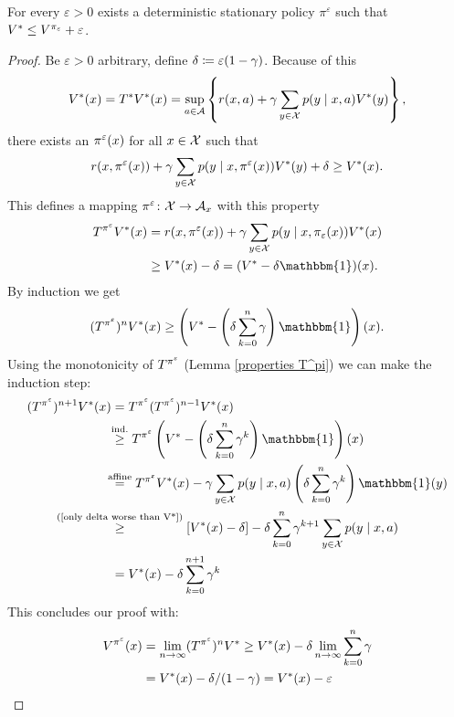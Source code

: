 \begin{prop}\label{epsilon optimal}
	For every \(\varepsilon>0\) exists a deterministic stationary policy \(\pi^\varepsilon\) such that \(V^* \le V^{\pi_\varepsilon}+\varepsilon \).
\end{prop}
\begin{proof}
	Be \(\varepsilon>0 \) arbitrary,  define \(\delta\coloneqq \varepsilon (1-\gamma) \). Because of this
	\[
		V^*(x)=T^*V^*(x)=\sup_{a\in\mathcal{A}}
		\left\{r(x,a)+\gamma\sum_{y\in\mathcal{X}}p(y\mid x,a)V^*(y) \right\},
	\]
	there exists an \(\pi^\varepsilon(x)\) for all \(x\in\mathcal{X}\) such that
	\begin{align}\label{epsilon optimal policy}
		r(x,\pi^\varepsilon(x))+\gamma\sum_{y\in\mathcal{X}}p(y\mid x,\pi^\varepsilon(x))V^*(y) + \delta \ge V^*(x).
	\end{align}
	This defines a mapping \(\pi^\varepsilon\colon \mathcal{X}\to\mathcal{A}_x\) with this property
	\begin{align}\label{only delta worse than V*}
		T^{\pi^\vep} V^*(x)
		&=r(x,\pi^\vep(x))+\gamma \sum_{y\in\cX}p(y\mid x,\pi_\vep(x)) V^*(x)\\
		&\ge V^*(x) -\delta = (V^* -\delta \mathbbm{1}) (x).\nonumber
	\end{align}
	By induction we get 
	\[
		(T^{\pi^\vep})^n V^*(x)\ge \left(V^*-\left(\delta\sum_{k=0}^n\gamma\right) \mathbbm{1}\right) (x).
	\] 
	Using the monotonicity of \(T^{\pi^\varepsilon}\) (Lemma \ref{properties T^pi}) we can make the induction step:
	\begin{align*}
		(T^{\pi^\vep})^{n+1} V^*(x)
		&=T^{\pi^\vep} (T^{\pi^\vep})^{n-1} V^*(x)\\
		&\lxgq{\text{ind.}} T^{\pi^\vep} \left(V^*-\left(\delta\sum_{k=0}^n\gamma^k\right) \mathbbm{1}\right)(x)\\
		&\lxeq{\text{affine}} T^{\pi^\vep} V^*(x) - \gamma \sum_{y\in\cX} p(y\mid x, a) \left(\delta\sum_{k=0}^n\gamma^k\right) \mathbbm{1}(y)\\
		&\lxgq{\text{(\ref{only delta worse than V*})}} [V^*(x)-\delta] - \delta\sum_{k=0}^n\gamma^{k+1} \sum_{y\in\cX} p(y\mid x,a)\\
		&=V^*(x)-\delta \sum_{k=0}^{n+1}\gamma^k
	\end{align*}
	This concludes our proof with:
	\begin{align*}
		V^{\pi^\varepsilon}(x)&=\lim_{n\to\infty} (T^{\pi^\varepsilon})^n V^* 
		\ge V^*(x)-\delta\lim_{n\to\infty}\sum_{k=0}^n\gamma\\
		&=V^*(x)-\delta/(1-\gamma)=V^*(x)-\varepsilon \qedhere
	\end{align*}
\end{proof}


